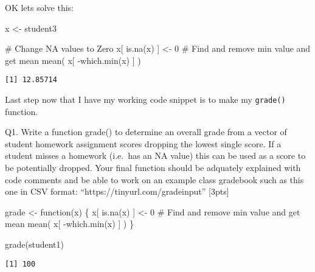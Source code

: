 \documentclass[
  letterpaper,
  DIV=11,
  numbers=noendperiod]{scrartcl}
\newenvironment{Shaded}{\begin{snugshade}}{\end{snugshade}}
\newcommand{\CommentTok}[1]{\textcolor[rgb]{0.37,0.37,0.37}{#1}}
\newcommand{\ControlFlowTok}[1]{\textcolor[rgb]{0.00,0.23,0.31}{#1}}
\newcommand{\DecValTok}[1]{\textcolor[rgb]{0.68,0.00,0.00}{#1}}
\newcommand{\FunctionTok}[1]{\textcolor[rgb]{0.28,0.35,0.67}{#1}}
\newcommand{\NormalTok}[1]{\textcolor[rgb]{0.00,0.23,0.31}{#1}}
\newcommand{\OtherTok}[1]{\textcolor[rgb]{0.00,0.23,0.31}{#1}}
\newcommand{\SpecialCharTok}[1]{\textcolor[rgb]{0.37,0.37,0.37}{#1}}
\begin{document}
OK lets solve this:

\begin{Shaded}
\begin{Highlighting}[]
\NormalTok{x }\OtherTok{\textless{}{-}}\NormalTok{ student3}

\CommentTok{\# Change NA values to Zero}
\NormalTok{x[ }\FunctionTok{is.na}\NormalTok{(x) ] }\OtherTok{\textless{}{-}} \DecValTok{0}
\CommentTok{\# Find and remove min value and get mean}
\FunctionTok{mean}\NormalTok{( x[ }\SpecialCharTok{{-}}\FunctionTok{which.min}\NormalTok{(x) ] )}
\end{Highlighting}
\end{Shaded}

\begin{verbatim}
[1] 12.85714
\end{verbatim}

Last step now that I have my working code snippet is to make my
\texttt{grade()} function.

Q1. Write a function grade() to determine an overall grade from a vector
of student homework assignment scores dropping the lowest single score.
If a student misses a homework (i.e.~has an NA value) this can be used
as a score to be potentially dropped. Your final function should be
adquately explained with code comments and be able to work on an example
class gradebook such as this one in CSV format:
``https://tinyurl.com/gradeinput'' {[}3pts{]}

\begin{Shaded}
\begin{Highlighting}[]
\NormalTok{grade }\OtherTok{\textless{}{-}} \ControlFlowTok{function}\NormalTok{(x) \{}
\NormalTok{  x[ }\FunctionTok{is.na}\NormalTok{(x) ] }\OtherTok{\textless{}{-}} \DecValTok{0}
  \CommentTok{\# Find and remove min value and get mean}
  \FunctionTok{mean}\NormalTok{( x[ }\SpecialCharTok{{-}}\FunctionTok{which.min}\NormalTok{(x) ] )}
\NormalTok{\}}
\end{Highlighting}
\end{Shaded}

\begin{Shaded}
\begin{Highlighting}[]
\FunctionTok{grade}\NormalTok{(student1)}
\end{Highlighting}
\end{Shaded}

\begin{verbatim}
[1] 100
\end{verbatim}
\end{document}
